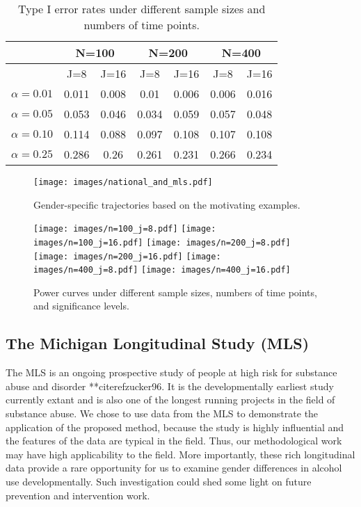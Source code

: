 \begin{table}[htbp]
\begin{center}
\caption{Type I error rates under different sample sizes and
numbers of time points.}
\begin{tabular}{c|cccccc}
  \hline
 &  \multicolumn{2}{c}{N=100}  & \multicolumn{2}{c}{N=200} & \multicolumn{2}{c}{N=400} \\
\hline
& J=8& J=16&  J=8&J=16 &J=8&J=16\\
      \hline
$\alpha=0.01$&0.011 &0.008 &0.01  &0.006 &0.006&0.016\\
$\alpha=0.05$&0.053 &0.046 &0.034  &0.059 &0.057&0.048\\
$\alpha=0.10$&0.114 & 0.088& 0.097 &0.108 &0.107&0.108\\
$\alpha=0.25$&0.286 & 0.26& 0.261 &0.231 &0.266&0.234\\
      \hline
\end{tabular}
\end{center}
\end{table}


\newpage
\begin{figure}
  \begin{center}
    \texttt{[image: images/national\_and\_mls.pdf]}
    \caption{Gender-specific trajectories based on the motivating examples.}
  \end{center}
\end{figure}

\begin{figure}
\centering
\texttt{[image: images/n=100\_j=8.pdf]}
\texttt{[image: images/n=100\_j=16.pdf]}
\texttt{[image: images/n=200\_j=8.pdf]}
\texttt{[image: images/n=200\_j=16.pdf]}
\texttt{[image: images/n=400\_j=8.pdf]}
\texttt{[image: images/n=400\_j=16.pdf]}
\caption{Power curves under different sample sizes, numbers of
time points, and significance levels.}
\end{figure}




\subsection{The Michigan Longitudinal Study (MLS)}

The MLS is an ongoing prospective study of people at high risk for
substance abuse and disorder **citeref{zucker96}. It is the
developmentally earliest study currently extant and is also one of
the longest running projects in the field of substance abuse. We
chose to use data from the MLS to demonstrate the application of
the proposed method, because the study is highly influential and
the features of the data are typical in the field. Thus, our
methodological work may have high applicability to the field. More
importantly, these rich longitudinal data provide a rare
opportunity for us to examine gender differences in alcohol use
developmentally. Such investigation could shed some light on
future prevention and intervention work.

